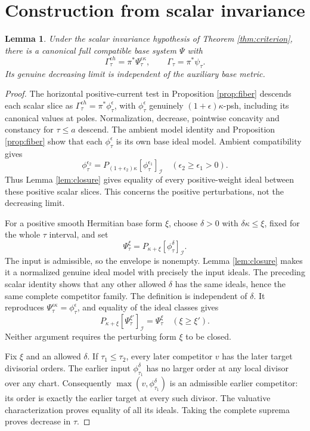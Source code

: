 \documentclass[11pt]{article}
\newcommand{\PI}[2]{P_{#1}[#2]_{\mathcal I}}
\newtheorem{lemma}[theorem]{Lemma}
\begin{document}
\section{Construction from scalar invariance}
\begin{lemma}\label{lem:scalar}
Under the scalar invariance hypothesis of Theorem \ref{thm:criterion},
there is a canonical full compatible base system $\Psi$ with
\[
 \Gamma_\tau^{\epsilon h}=\pi^*\Psi_\tau^{\epsilon\kappa},
 \qquad \Gamma_\tau=\pi^*\psi_\tau.
\]
Its genuine decreasing limit is independent of the auxiliary base metric.
\end{lemma}
\begin{proof}
The horizontal positive-current test in Proposition \ref{prop:fiber}
descends each scalar slice as
$\Gamma_\tau^{\epsilon h}=\pi^*\phi_\tau^\epsilon$, with
$\phi_\tau^\epsilon$ genuinely $(1+\epsilon)\kappa$-psh, including
its canonical values at poles. Normalization, decrease, pointwise concavity
and constancy for $\tau\leq a$ descend. The ambient model identity and
Proposition \ref{prop:fiber} show that each $\phi_\tau^\epsilon$ is
its own base ideal model. Ambient compatibility gives
\[
 \phi_\tau^{\epsilon_2}
 =\PI{(1+\epsilon_2)\kappa}{\phi_\tau^{\epsilon_1}}
 \quad(\epsilon_2\geq\epsilon_1>0).
\]
Thus Lemma \ref{lem:closure} gives equality of every positive-weight
ideal between these positive scalar slices. This concerns the positive
perturbations, not the decreasing limit.

For a positive smooth Hermitian base form $\xi$, choose $\delta>0$ with
$\delta\kappa\leq\xi$, fixed for the whole $\tau$ interval, and set
\[
 \Psi_\tau^\xi=\PI{\kappa+\xi}{\phi_\tau^\delta}.
\]
The input is admissible, so the envelope is nonempty. Lemma
\ref{lem:closure} makes it a normalized genuine ideal model with precisely
the input ideals. The preceding scalar identity shows that any other
allowed $\delta$ has the same ideals, hence the same complete competitor
family. The definition is independent of $\delta$. It reproduces
$\Psi_\tau^{\epsilon\kappa}=\phi_\tau^\epsilon$, and equality of
the ideal classes gives
\[
 \PI{\kappa+\xi}{\Psi_\tau^{\xi'}}=\Psi_\tau^\xi
 \quad(\xi\geq\xi').
\]
Neither argument requires the perturbing form $\xi$ to be closed.

Fix $\xi$ and an allowed $\delta$. If $\tau_1\leq\tau_2$, every
later competitor $v$ has the later target divisorial orders. The earlier
input $\phi_{\tau_1}^\delta$ has no larger order at any local divisor
over any chart. Consequently
$\max(v,\phi_{\tau_1}^\delta)$ is an admissible earlier competitor:
its order is exactly the earlier target at every such divisor. The
valuative characterization proves equality of all its ideals. Taking
the complete suprema proves decrease in $\tau$.


\end{proof}
\end{document}
